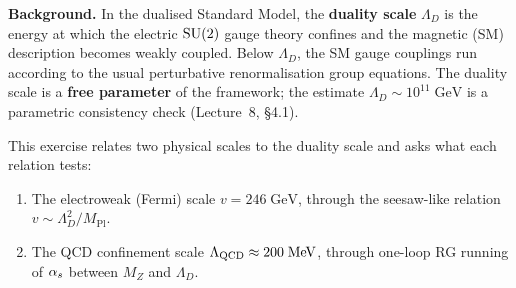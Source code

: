 \documentclass[11pt,a4paper]{article}
\begin{document}
\noindent\textbf{Background.}
In the dualised Standard Model, the \textbf{duality scale}
$\Lambda_D$ is the energy at which the electric $\mathrm{SU}(2)$ gauge
theory confines and the magnetic (SM) description becomes weakly
coupled.  Below $\Lambda_D$, the SM gauge couplings run according
to the usual perturbative renormalisation group equations.  The
duality scale is a \textbf{free parameter} of the framework; the
estimate $\Lambda_D \sim 10^{11}\;\text{GeV}$ is a parametric
consistency check (Lecture~8, \S4.1).

This exercise relates two physical scales to the duality scale and
asks what each relation tests:
\begin{enumerate}
  \item The electroweak (Fermi) scale $v = 246\;\text{GeV}$,
    through the seesaw-like relation
    $v \sim \Lambda_D^2 / M_{\text{Pl}}$.
  \item The QCD confinement scale
    $\Lambda_{\mathrm{QCD}} \approx 200\;\text{MeV}$,
    through one-loop RG running of $\alpha_s$ between $M_Z$ and
    $\Lambda_D$.
\end{enumerate}

\medskip
\end{document}
